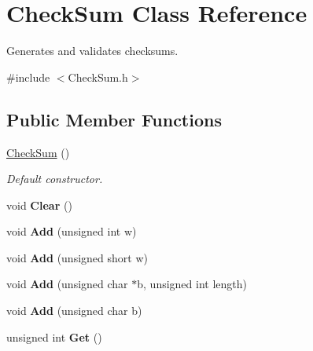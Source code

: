 \hypertarget{class_check_sum}{\section{Check\-Sum Class Reference}
\label{class_check_sum}
}


Generates and validates checksums.  




{\ttfamily \#include $<$Check\-Sum.\-h$>$}

\subsection*{Public Member Functions}
\begin{DoxyCompactItemize}
\item 
\hypertarget{class_check_sum_afe0b6f006d8c89231f2ebba3f9be3554}{\hyperlink{class_check_sum_afe0b6f006d8c89231f2ebba3f9be3554}{Check\-Sum} ()}\label{class_check_sum_afe0b6f006d8c89231f2ebba3f9be3554}

\begin{DoxyCompactList}\small\item\em Default constructor. \end{DoxyCompactList}\item 
\hypertarget{class_check_sum_a553c3143eb8950b1efabfef1bca8e7aa}{void {\bfseries Clear} ()}\label{class_check_sum_a553c3143eb8950b1efabfef1bca8e7aa}

\item 
\hypertarget{class_check_sum_af1b9cc5870c42ac9ea29322801a29a8c}{void {\bfseries Add} (unsigned int w)}\label{class_check_sum_af1b9cc5870c42ac9ea29322801a29a8c}

\item 
\hypertarget{class_check_sum_aaaea2aff24850092ce1de18bd4eee7bd}{void {\bfseries Add} (unsigned short w)}\label{class_check_sum_aaaea2aff24850092ce1de18bd4eee7bd}

\item 
\hypertarget{class_check_sum_a3feeb0e9697cf685b75259395a0100d2}{void {\bfseries Add} (unsigned char $\ast$b, unsigned int length)}\label{class_check_sum_a3feeb0e9697cf685b75259395a0100d2}

\item 
\hypertarget{class_check_sum_a01ec4e7ea4a38e069a3349c21e91f270}{void {\bfseries Add} (unsigned char b)}\label{class_check_sum_a01ec4e7ea4a38e069a3349c21e91f270}

\item 
\hypertarget{class_check_sum_acd195ac05c848b8d4ccdae7b7062657d}{unsigned int {\bfseries Get} ()}\label{class_check_sum_acd195ac05c848b8d4ccdae7b7062657d}

\end{DoxyCompactItemize}
